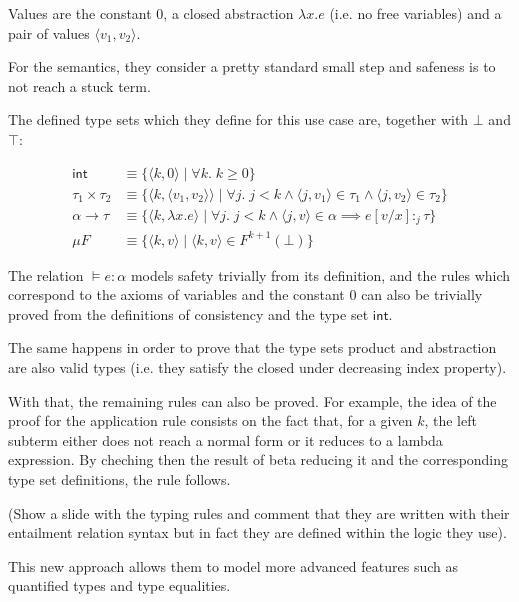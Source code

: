 \documentclass{article}
\begin{document}
Values are the constant $0$, a closed abstraction 
$\lambda x.e$ (i.e. no free variables) and a pair of values 
$\langle v_1, v_2 \rangle$.

For the semantics, they consider a pretty standard small step and 
safeness is to not reach a stuck term.

The defined type sets which they define for this use case are,
together with $\bot$ and $\top$:

\begin{align*}
  \mathsf{int} &\equiv \{ \langle k, 0 \rangle \;|\; 
    \forall k.\;k \geq 0 \} \\
  \tau_1 \times \tau_2 &\equiv 
    \{ \langle k, \langle v_1, v_2 \rangle \rangle \;|\; 
          \forall j.\;j < k \land
          \langle j, v_1\rangle \in \tau_1  \land 
          \langle j, v_2 \rangle \in \tau_2
    \} \\
  \alpha \rightarrow \tau &\equiv 
    \{ \langle k, \lambda x. e \rangle \;|\; 
        \forall j.\;j < k \land
        \langle j, v \rangle \in \alpha \implies
          e[v/x] :_j \tau
    \} \\ 
  \mu F &\equiv 
    \{ \langle k, v \rangle \;|\; \langle k, v \rangle \in 
      F^{k + 1}(\bot)
    \}
\end{align*}

The relation $\models e : \alpha$ models safety trivially from 
its definition, and the rules which correspond to the axioms 
of variables and the constant $0$ can also be trivially proved 
from the definitions of consistency and the type set 
$\mathsf{int}$.

The same happens in order to prove that the type sets product 
and abstraction are also valid types (i.e. they satisfy the 
closed under decreasing index property).

With that, the remaining rules can also be proved. For example,
the idea of the proof for the application rule consists on 
the fact that, for a given $k$, the left subterm either does not 
reach a normal form or it reduces to a lambda expression. By 
cheching then the result of beta reducing it and the corresponding 
type set definitions, the rule follows.

(Show a slide with the typing rules and comment that they are 
written with their entailment relation syntax but in fact 
they are defined within the logic they use).

This new approach allows them to model more advanced features 
such as quantified types and type equalities.
\end{document}
